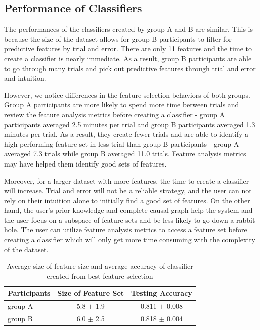 \subsection { Performance of Classifiers }
The performances of the classifiers created by group A and B are similar. This is because the size of the dataset allows for group B participants to filter for predictive features by trial and error. There are only 11 features and the time to create a classifier is nearly immediate. As a result, group B participants are able to go through many trials and pick out predictive features through trial and error and intuition.

However, we notice differences in the feature selection behaviors of both groups. Group A participants are more likely to spend more time between trials and review the feature analysis metrics before creating a classifier - group A participants averaged 2.5 minutes per trial and group B participants averaged 1.3 minutes per trial. As a result, they create fewer trials and are able to identify a high performing feature set in less trial than group B participants - group A averaged 7.3 trials while group B averaged 11.0 trials. Feature analysis metrics may have helped them identify good sets of features.

Moreover, for a larger dataset with more features, the time to create a classifier will increase. Trial and error will not be a reliable strategy, and the user can not rely on their intuition alone to initially find a good set of features. On the other hand, the user's prior knowledge and complete causal graph help the system and the user focus on a subspace of feature sets and be less likely to go down a rabbit hole. The user can utilize feature analysis metrics to access a feature set before creating a classifier which will only get more time consuming with the complexity of the dataset.

\begin{table}[]
\centering
\begin{tabular}{lcc}
\hline
Participants & \multicolumn{1}{l}{Size of Feature Set} & \multicolumn{1}{l}{Testing Accuracy} \\ \hline
group A      &  5.8 $\pm$ 1.9    &  0.811 $\pm$ 0.008        \\
group B      &  6.0 $\pm$ 2.5  &    0.818 $\pm$ 0.004        \\\hline
\end{tabular}
\caption{Average size of feature size and average accuracy of classifier created from best feature selection}
\label{AccuracyComparison}
\end{table}

